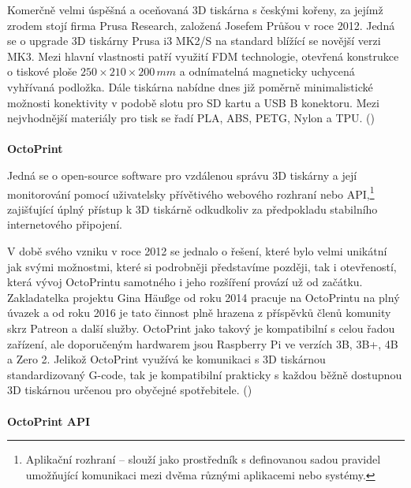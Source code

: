 \documentclass[twoside, 12pt]{article}
\begin{document}
Komerčně velmi úspěšná a oceňovaná 3D tiskárna s českými kořeny, za jejímž zrodem stojí firma Prusa Research, založená Josefem Průšou v roce 2012. Jedná se o upgrade 3D tiskárny Prusa i3 MK2/S na standard blížící se novější verzi MK3. Mezi hlavní vlastnosti patří využití FDM technologie, otevřená konstrukce o tiskové ploše $250\times 210\times 200\,mm$ a odnímatelná magneticky uchycená vyhřívaná podložka. Dále tiskárna nabídne dnes již poměrně minimalistické možnosti konektivity v podobě slotu pro SD kartu a USB B konektoru. Mezi nejvhodnější materiály pro tisk se řadí PLA, ABS, PETG, Nylon a TPU. (\cite{PrusaMk2})
\\
\\
\textbf{OctoPrint}

Jedná se o open-source software pro vzdálenou správu 3D tiskárny a její monitorování pomocí uživatelsky přívětivého webového rozhraní nebo API,\footnote{Aplikační rozhraní -- slouží jako prostředník s definovanou sadou pravidel umožňující komunikaci mezi dvěma různými aplikacemi nebo systémy.} zajišťující úplný přístup k 3D tiskárně odkudkoliv za předpokladu stabilního internetového připojení.

V době svého vzniku v roce 2012 se jednalo o řešení, které bylo velmi unikátní jak svými možnostmi, které si podrobněji představíme později, tak i otevřeností, která vývoj OctoPrintu samotného i jeho rozšíření provází už od začátku. Zakladatelka projektu Gina Häußge od roku 2014 pracuje na OctoPrintu na plný úvazek a od roku 2016 je tato činnost plně hrazena z příspěvků členů komunity skrz Patreon a další služby. OctoPrint jako takový je kompatibilní s celou řadou zařízení, ale doporučeným hardwarem jsou Raspberry Pi ve verzích 3B, 3B+, 4B a Zero 2. Jelikož OctoPrint využívá ke komunikaci s 3D tiskárnou standardizovaný G-code, tak je kompatibilní prakticky s každou běžně dostupnou 3D tiskárnou určenou pro obyčejné spotřebitele. (\cite{OctoPrintBasic})
\\
\\
\textbf{OctoPrint API}
\end{document}
